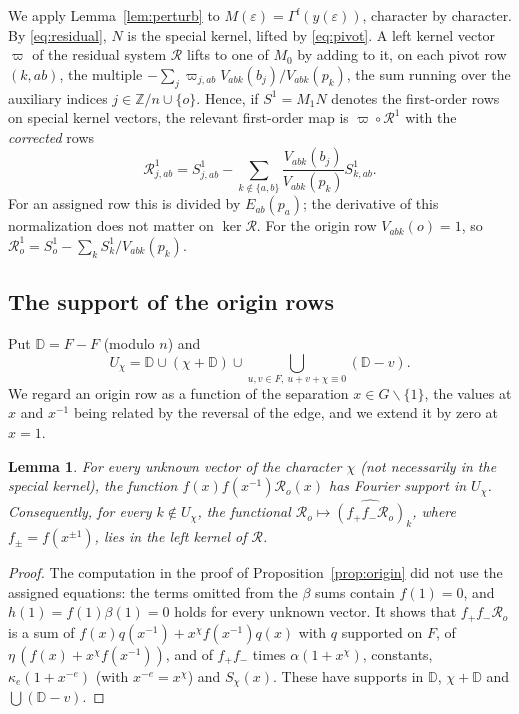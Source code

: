 \documentclass{amsart}
\newtheorem{lemma}[theorem]{Lemma}
\theoremstyle{definition}
\theoremstyle{remark}
\numberwithin{equation}{section}
\newcommand{\ZZ}{\mathbb{Z}}
\begin{document}
We apply Lemma~\ref{lem:perturb} to $M(\varepsilon)=\Gamma^{\mathrm f}(y(\varepsilon))$,
character by character. By \eqref{eq:residual}, $N$ is the special kernel, lifted by
\eqref{eq:pivot}. A left kernel vector $\varpi$ of the residual system $\mathcal R$
lifts to one of $M_0$ by adding to it, on each pivot row $(k,ab)$, the multiple
$-\sum_j\varpi_{j,ab}V_{abk}(b_j)/V_{abk}(p_k)$, the sum running over the auxiliary
indices $j\in\ZZ/n\cup\{o\}$. Hence, if $S^1=M_1N$ denotes the first-order rows on special
kernel vectors, the relevant first-order map is $\varpi\circ\mathcal R^1$ with the
\emph{corrected} rows
\begin{equation}\label{eq:R1}
  \mathcal R^1_{j,ab}=S^1_{j,ab}-\sum_{k\notin\{a,b\}}
  \frac{V_{abk}(b_j)}{V_{abk}(p_k)}S^1_{k,ab}.
\end{equation}
For an assigned row this is divided by $E_{ab}(p_a)$; the derivative of this
normalization does not matter on $\ker\mathcal R$. For the origin row $V_{abk}(o)=1$, so
$\mathcal R^1_o=S^1_o-\sum_kS^1_k/V_{abk}(p_k)$.

\subsection{The support of the origin rows}
Put $\mathbb D=F-F$ (modulo $n$) and
\begin{equation}\label{eq:U}
  U_\chi=\mathbb D\cup(\chi+\mathbb D)\cup\bigcup_{u,v\in F,\ u+v+\chi\equiv0}(\mathbb D-v).
\end{equation}
We regard an origin row as a function of the separation $x\in G\smallsetminus\{1\}$,
the values at $x$ and $x^{-1}$ being related by the reversal of the edge, and we
extend it by zero at $x=1$.

\begin{lemma}\label{lem:support}
For every unknown vector of the character $\chi$ (not necessarily in the special
kernel), the function $f(x)f(x^{-1})\mathcal R_o(x)$ has Fourier support in $U_\chi$.
Consequently, for every $k\notin U_\chi$, the functional
$\mathcal R_o\mapsto\widehat{(f_+f_-\mathcal R_o)}_k$, where $f_\pm=f(x^{\pm1})$, lies
in the left kernel of $\mathcal R$.
\end{lemma}

\begin{proof}
The computation in the proof of Proposition~\ref{prop:origin} did not use the assigned
equations: the terms omitted from the $\beta$ sums contain $f(1)=0$, and
$h(1)=f(1)\beta(1)=0$ holds for every unknown vector. It shows that
$f_+f_-\mathcal R_o$ is a sum of $f(x)q(x^{-1})+x^\chi f(x^{-1})q(x)$ with $q$ supported on
$F$, of $\eta\,(f(x)+x^\chi f(x^{-1}))$, and of $f_+f_-$ times
$\alpha(1+x^\chi)$, constants, $\kappa_e(1+x^{-e})$ (with $x^{-e}=x^\chi$) and
$S_\chi(x)$. These have supports in $\mathbb D$, $\chi+\mathbb D$ and
$\bigcup(\mathbb D-v)$.
\end{proof}
\end{document}
